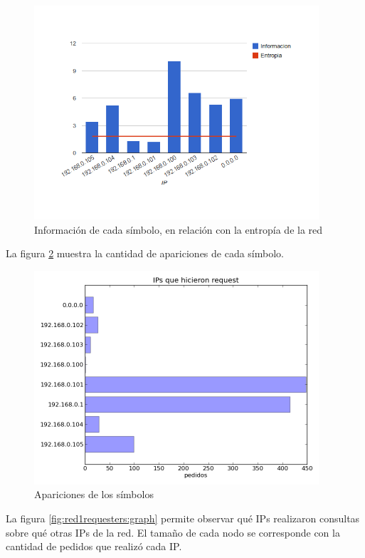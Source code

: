 \documentclass{article}
\begin{document}
\begin{figure}[h!]
    \centering                                                       
    \includegraphics[width=300pt]{consultas1.png}
    \caption{Información de cada símbolo, en relación con la
        entropía de la red}
    \label{fig:red1requesters:infoentro}
\end{figure}

La figura \ref{fig:red1requesters:count} muestra la cantidad de apariciones de
cada símbolo.

\begin{figure}[h!]
    \centering                                                       
    \includegraphics[width=300pt]{red1requesters.png}
    \caption{Apariciones de los símbolos}
    \label{fig:red1requesters:count}
\end{figure}

La figura \ref{fig:red1requesters:graph} permite observar qué IPs realizaron
consultas sobre qué otras IPs de la red. El tamaño de cada nodo se corresponde
con la cantidad de pedidos que realizó cada IP.
\end{document}
